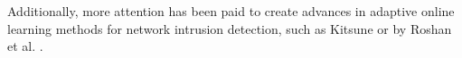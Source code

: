 \documentclass[a4paper,12pt,twoside]{article}
\begin{document}
Additionally, more attention has been paid to create advances in adaptive online learning methods for network intrusion detection, such as Kitsune \cite{mirsky2018kitsune} or by Roshan et al. \cite{roshan2018adaptive}.





\end{document}

